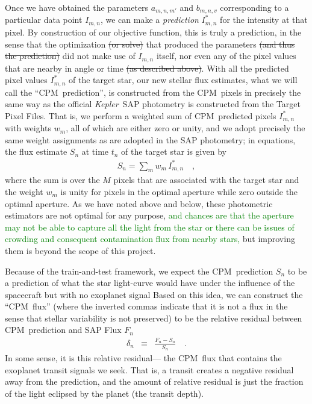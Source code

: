 \documentclass[12pt, preprint]{aastex}
\newcommand{\project}[1]{\textsl{#1}}
\newcommand{\Kepler}{\project{Kepler}}
\newcommand{\name}{CPM}
\newcommand{\revise}[1]{\textcolor{green}{#1}}
\newcommand{\remove}[1]{\sout{#1}}
\begin{document}
Once we have obtained the parameters $a_{m,n,m'}$ and $b_{m,n,v}$ corresponding to a particular data point $I_{m,n}$,
  we can make a \emph{prediction} $I^{\ast}_{m,n}$ for the intensity at that pixel.
By construction of our objective function, this is truly a prediction,
  in the sense that the optimization \remove{(or solve)} that produced the parameters
  \remove{(and thus the prediction)}
  did not make use of $I_{m,n}$ itself,
  nor even any of the pixel values that are nearby in angle or time
  \remove{(as described above)}.
  With all the predicted pixel values $I^{\ast}_{m,n}$ of the target star,  
  our new stellar flux estimates,
  what we will call the ``\name\ prediction'',
  is constructed from the \name\ pixels
  in precisely the same way as the official \Kepler\ SAP photometry
  is constructed from the Target Pixel Files.
That is, we perform a weighted sum of \name\ predicted pixels $I^{\ast}_{m,n}$ with weights $w_m$,
  all of which are either zero or unity,
  and we adopt precisely the same weight assignments as are adopted in the SAP photometry;
  in equations, the flux estimate $S_n$ at time $t_n$ of the target star is given by
\begin{eqnarray}
S_n = \sum_m w_m\,I^{\ast}_{m,n}
\quad ,
\end{eqnarray}
where the sum is over the $M$ pixels that are associated with the target star and the weight $w_m$ is unity for pixels in the optimal
aperture while zero outside the optimal aperture.
As we have noted above and below, these photometric estimators are not optimal for any purpose, \revise{and chances are that the aperture may not be able to capture all the light from the star or there can be issues of crowding and consequent contamination flux from nearby stars,}
  but improving them is beyond the scope of this project.

Because of the train-and-test framework,  
  we expect the \name\ prediction $S_{n}$ to be a prediction of
  what the star light-curve would have under the influence of the spacecraft but with no exoplanet signal 
Based on this idea, 
  we can construct the ``\name\ flux'' 
  (where the inverted commas indicate that it is not a flux in the sense that stellar variability is not preserved) 
  to be the relative residual between \name\ prediction and SAP Flux $F_{n}$
\begin{eqnarray}
\delta_{n}&\equiv&\frac{F_{n} - S_{n}}{S_{n}}
\quad .
\end{eqnarray} 
In some sense, it is this relative residual--- the \name\ flux that contains the exoplanet transit signals we seek. 
That is, a transit creates a negative residual away from the prediction, 
  and the amount of relative residual is just the fraction of the light eclipsed by the planet (the transit depth). 
\end{document}
